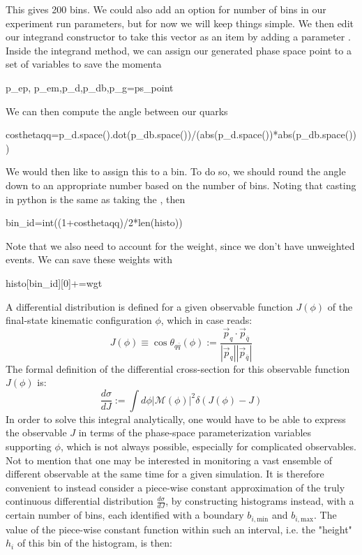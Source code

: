 This gives 200 bins. We could also add an option for number of  bins in our experiment run parameters, but for now we will keep things simple. We then edit our integrand constructor to take this vector as an item by adding a parameter . Inside the integrand method, we can assign our generated phase space point to a set of variables to save the momenta 
\begin{codeenv}
    p_ep, p_em,p_d,p_db,p_g=ps_point
\end{codeenv}
We can then compute the angle between our quarks
\begin{codeenv}
    costhetaqq=p_d.space().dot(p_db.space())/(abs(p_d.space())*abs(p_db.space()))
\end{codeenv}
We would then like to assign this to a bin. To do so, we should round the angle down to an appropriate number based on the number of bins. Noting that  casting in python is the same as taking the , then
\begin{codeenv}
    bin_id=int((1+costhetaqq)/2*len(histo))
\end{codeenv}
Note that we also need to account for the weight, since we don't have unweighted events. We can save these weights with
\begin{codeenv}
            histo[bin_id][0]+=wgt
\end{codeenv}

A differential distribution is defined for a given observable function $J(\phi)$ of the final-state kinematic configuration $\phi$, which in case reads:
\begin{equation}    
J(\phi) \equiv \cos\theta_{q\bar{q}}(\phi) := \frac{\vec{p}_q\cdot \vec{p}_{\bar{q}}}{|\vec{p}_q||\vec{p}_{\bar{q}}|}
\end{equation}
The formal definition of the differential cross-section for this observable function $J(\phi)$ is:
\begin{equation}    
\frac{d \sigma}{d J} := \int d \phi |\mathcal{M}(\phi)|^2 \delta \left( J(\phi) - J \right)
\end{equation}
In order to solve this integral analytically, one would have to be able to express the observable $J$ in terms of the phase-space parameterization variables supporting $\phi$, which is not always possible, especially for complicated observables. Not to mention that one may be interested in monitoring a vast ensemble of different observable at the same time for a given simulation.
It is therefore convenient to instead consider a piece-wise constant approximation of the truly continuous differential distribution $\frac{d \sigma}{d J}$, by constructing histograms instead, with a certain number of bins, each identified with a boundary $b_{i,\text{min}}$ and $b_{i,\text{max}}$. The value of the piece-wise constant function within such an interval, i.e. the "height" $h_i$ of this bin of the histogram, is then:

